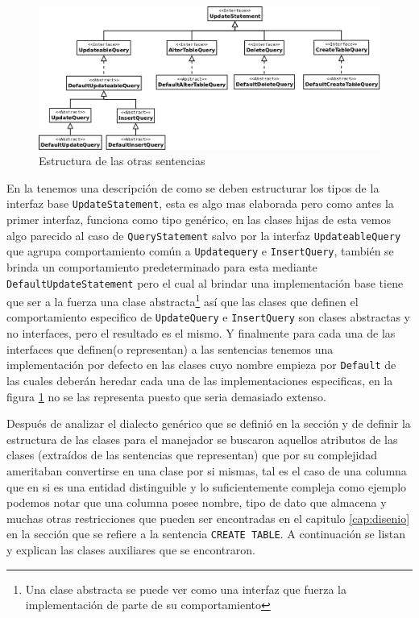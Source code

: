\begin{figure}
  \centering
    \includegraphics[width=\textwidth]{figuras/crossdb-update.png}
  \caption{Estructura de las otras sentencias}
  \label{fig:update}
\end{figure}

En la  tenemos una descripción de como se deben estructurar los tipos de la interfaz base \verb=UpdateStatement=, esta es algo mas elaborada pero como antes la primer interfaz, funciona como tipo genérico, en las clases hijas de esta vemos algo parecido al caso de \verb=QueryStatement= salvo por la interfaz \verb=UpdateableQuery= que agrupa comportamiento común a \verb=Updatequery= e \verb=InsertQuery=, también se brinda un comportamiento predeterminado para esta mediante \verb=DefaultUpdateStatement= pero el cual al brindar una implementación base tiene que ser a la fuerza una clase abstracta\footnote{Una clase abstracta se puede ver como una interfaz que fuerza la implementación de parte de su comportamiento} así que las clases que definen el comportamiento especifico de \verb=UpdateQuery= e \verb=InsertQuery= son clases abstractas y no interfaces, pero el resultado es el mismo. Y finalmente para cada una de las interfaces que definen(o representan) a las sentencias tenemos una implementación por defecto en las clases cuyo nombre empieza por \verb=Default= de las cuales deberán heredar cada una de las implementaciones especificas, en la figura \ref{fig:update} no se las representa puesto que seria demasiado extenso.

Después de analizar el dialecto genérico que se definió en la sección  y de definir la estructura de las clases para el manejador se buscaron aquellos atributos de las clases (extraídos de las sentencias que representan) que por su complejidad ameritaban convertirse en una clase por si mismas, tal es el caso de una columna que en si es una entidad distinguible y lo suficientemente compleja como ejemplo podemos notar que una columna posee nombre, tipo de dato que almacena y muchas otras restricciones que pueden ser encontradas en el capitulo \ref{cap:disenio} en la sección que se refiere a la sentencia \verb=CREATE TABLE=. A continuación se listan y explican las clases auxiliares que se encontraron. 


